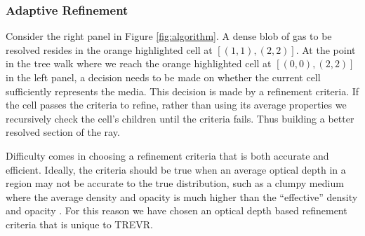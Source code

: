\documentclass[fleq,usenatbib]{mnras}
\newcommand{\acro}{TREVR}
\begin{document}
\subsubsection{Adaptive Refinement}\label{sec:adref}
Consider the right panel in Figure \ref{fig:algorithm}. A dense blob of gas 
to be resolved resides in the orange highlighted cell at $[(1,1),(2,2)]$. At 
the point in the tree walk where we reach the orange highlighted cell at 
$[(0,0),(2,2)]$ in the left panel, a decision needs to be made on whether the 
current cell sufficiently represents the media. This decision is made by a 
refinement criteria. If the cell passes the criteria to refine, rather than 
using its average properties we recursively check the cell's children until 
the criteria fails. Thus building a better resolved section of the ray. 

Difficulty comes in choosing a refinement criteria that is both accurate and 
efficient. Ideally, the criteria should be true when an average optical depth 
in a region may not be accurate to the true distribution, such as a clumpy 
medium where the average density and opacity is much higher than the 
``effective'' density and opacity \citep{varosiDwek99, hegmanKegel03}. For 
this reason we have chosen an optical depth based refinement criteria that is 
unique to \acro{}.
\end{document}

